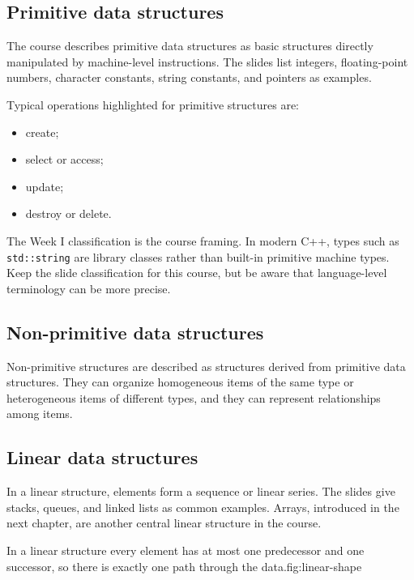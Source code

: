 \subsection{Primitive data structures}

The course describes primitive data structures as basic structures directly manipulated by machine-level instructions. The slides list integers, floating-point numbers, character constants, string constants, and pointers as examples.

Typical operations highlighted for primitive structures are:

\begin{itemize}
  \item create;
  \item select or access;
  \item update;
  \item destroy or delete.
\end{itemize}

\begin{clarification}
The Week I classification is the course framing. In modern C++, types such as \texttt{std::string} are library classes rather than built-in primitive machine types. Keep the slide classification for this course, but be aware that language-level terminology can be more precise.
\end{clarification}

\subsection{Non-primitive data structures}

Non-primitive structures are described as structures derived from primitive data structures. They can organize homogeneous items of the same type or heterogeneous items of different types, and they can represent relationships among items.

\subsection{Linear data structures}

In a linear structure, elements form a sequence or linear series. The slides give stacks, queues, and linked lists as common examples. Arrays, introduced in the next chapter, are another central linear structure in the course.

\begin{adsfig}{In a linear structure every element has at most one predecessor and one
successor, so there is exactly one path through the data.}{fig:linear-shape}
\end{adsfig}

